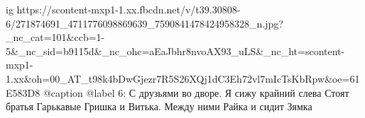  
 
 
 
 

\ifcmt
  ig https://scontent-mxp1-1.xx.fbcdn.net/v/t39.30808-6/271874691_4711776098869639_7590841478424958328_n.jpg?_nc_cat=101&ccb=1-5&_nc_sid=b9115d&_nc_ohc=aEaJbhr8nvoAX93_uLS&_nc_ht=scontent-mxp1-1.xx&oh=00_AT_t98k4bDwGjezr7R5S26XQj1dC3Eh72vl7mIcTsKbRpw&oe=61E583D8
  @caption @label 6: С друзьями во дворе. Я сижу крайний слева Стоят братья Гарькавые Гришка и Витька. Между ними Райка и сидит Зямка
\fi
